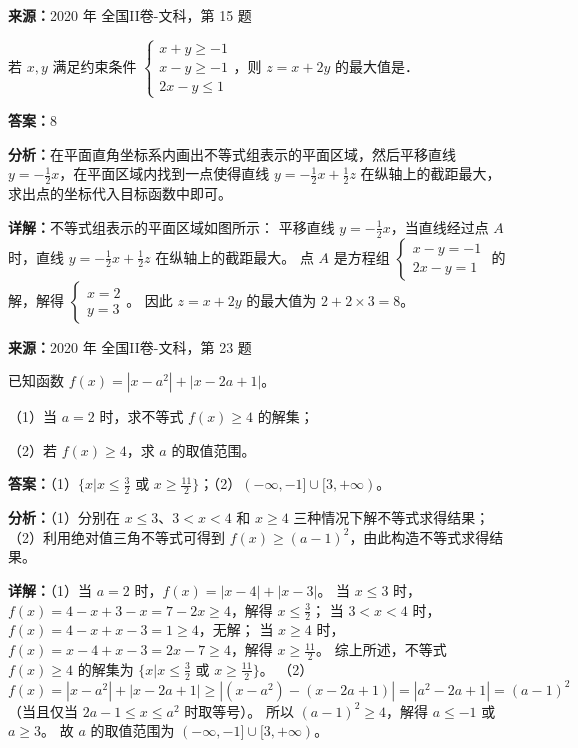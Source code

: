 \begin{question}[points=5]
\textbf{来源：}2020 年 全国II卷-文科，第 15 题\par
若 $x,y$ 满足约束条件 $\begin{cases} x+y\ge -1 \\ x-y\ge -1 \\ 2x-y\le 1 \end{cases}$，则 $z=x+2y$ 的最大值是．
\fillin[{$8$}]
\begin{solution}
\textbf{答案：}$8$

\textbf{分析：}在平面直角坐标系内画出不等式组表示的平面区域，然后平移直线 $y=-\frac{1}{2}x$，在平面区域内找到一点使得直线 $y=-\frac{1}{2}x+\frac{1}{2}z$ 在纵轴上的截距最大，求出点的坐标代入目标函数中即可。

\textbf{详解：}不等式组表示的平面区域如图所示：
平移直线 $y=-\frac{1}{2}x$，当直线经过点 $A$ 时，直线 $y=-\frac{1}{2}x+\frac{1}{2}z$ 在纵轴上的截距最大。
点 $A$ 是方程组 $\begin{cases} x-y=-1 \\ 2x-y=1 \end{cases}$ 的解，解得 $\begin{cases} x=2 \\ y=3 \end{cases}$。
因此 $z=x+2y$ 的最大值为 $2+2\times3=8$。
\end{solution}
\end{question}

\begin{question}[points=10]
\textbf{来源：}2020 年 全国II卷-文科，第 23 题\par
[选修4—5：不等式选讲]

已知函数 $f(x)=|x-a^2|+|x-2a+1|$。

（1）当 $a=2$ 时，求不等式 $f(x)\ge4$ 的解集；

（2）若 $f(x)\ge4$，求 $a$ 的取值范围。
\begin{solution}
\textbf{答案：}（1）$\{x|x\le\frac{3}{2}\text{ 或 }x\ge\frac{11}{2}\}$；（2）$(-\infty,-1]\cup[3,+\infty)$。

\textbf{分析：}（1）分别在 $x\le3$、$3<x<4$ 和 $x\ge4$ 三种情况下解不等式求得结果；
（2）利用绝对值三角不等式可得到 $f(x)\ge(a-1)^2$，由此构造不等式求得结果。

\textbf{详解：}（1）当 $a=2$ 时，$f(x)=|x-4|+|x-3|$。
当 $x\le3$ 时，$f(x)=4-x+3-x=7-2x\ge4$，解得 $x\le\frac{3}{2}$；
当 $3<x<4$ 时，$f(x)=4-x+x-3=1\ge4$，无解；
当 $x\ge4$ 时，$f(x)=x-4+x-3=2x-7\ge4$，解得 $x\ge\frac{11}{2}$。
综上所述，不等式 $f(x)\ge4$ 的解集为 $\{x|x\le\frac{3}{2}\text{ 或 }x\ge\frac{11}{2}\}$。
（2）$f(x)=|x-a^2|+|x-2a+1|\ge|(x-a^2)-(x-2a+1)|=|a^2-2a+1|=(a-1)^2$（当且仅当 $2a-1\le x\le a^2$ 时取等号）。
所以 $(a-1)^2\ge4$，解得 $a\le-1$ 或 $a\ge3$。
故 $a$ 的取值范围为 $(-\infty,-1]\cup[3,+\infty)$。
\end{solution}
\end{question}

